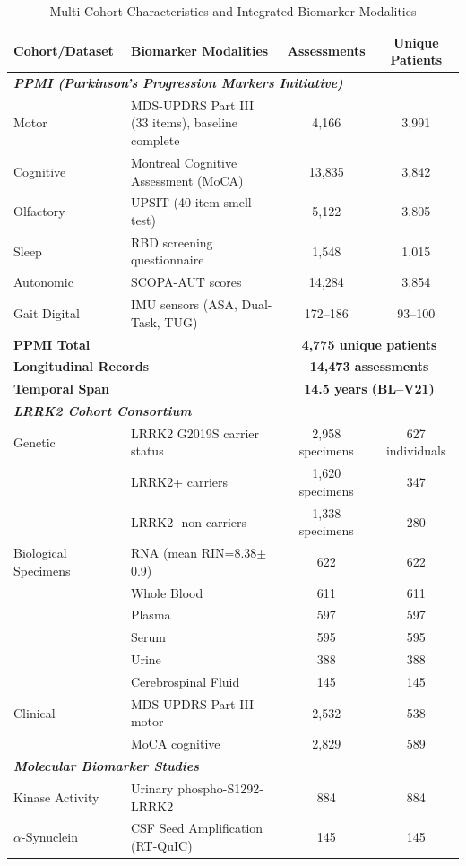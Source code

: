 \documentclass[11pt]{article}
\begin{document}
\begin{table}[ht]
\centering
\caption{Multi-Cohort Characteristics and Integrated Biomarker Modalities}
\label{tab:cohorts}
\footnotesize
\begin{tabular}{p{3.5cm}p{5cm}cc}
\toprule
\textbf{Cohort/Dataset} & \textbf{Biomarker Modalities} & \textbf{Assessments} & \textbf{Unique Patients} \\
\midrule
\multicolumn{4}{l}{\textit{\textbf{PPMI (Parkinson's Progression Markers Initiative)}}} \\
\midrule
Motor & MDS-UPDRS Part III (33 items), baseline complete & 4,166 & 3,991 \\
Cognitive & Montreal Cognitive Assessment (MoCA) & 13,835 & 3,842 \\
Olfactory & UPSIT (40-item smell test) & 5,122 & 3,805 \\
Sleep & RBD screening questionnaire & 1,548 & 1,015 \\
Autonomic & SCOPA-AUT scores & 14,284 & 3,854 \\
Gait Digital & IMU sensors (ASA, Dual-Task, TUG) & 172--186 & 93--100 \\
\midrule
\multicolumn{2}{l}{\textbf{PPMI Total}} & \multicolumn{2}{c}{\textbf{4,775 unique patients}} \\
\multicolumn{2}{l}{\textbf{Longitudinal Records}} & \multicolumn{2}{c}{\textbf{14,473 assessments}} \\
\multicolumn{2}{l}{\textbf{Temporal Span}} & \multicolumn{2}{c}{\textbf{14.5 years (BL--V21)}} \\
\midrule
\multicolumn{4}{l}{\textit{\textbf{LRRK2 Cohort Consortium}}} \\
\midrule
Genetic & LRRK2 G2019S carrier status & 2,958 specimens & 627 individuals \\
& \quad LRRK2+ carriers & 1,620 specimens & 347 \\
& \quad LRRK2- non-carriers & 1,338 specimens & 280 \\
Biological Specimens & RNA (mean RIN=8.38$\pm$0.9) & 622 & 622 \\
& Whole Blood & 611 & 611 \\
& Plasma & 597 & 597 \\
& Serum & 595 & 595 \\
& Urine & 388 & 388 \\
& Cerebrospinal Fluid & 145 & 145 \\
Clinical & MDS-UPDRS Part III motor & 2,532 & 538 \\
& MoCA cognitive & 2,829 & 589 \\
\midrule
\multicolumn{4}{l}{\textit{\textbf{Molecular Biomarker Studies}}} \\
\midrule
Kinase Activity & Urinary phospho-S1292-LRRK2 & 884 & 884 \\
$\alpha$-Synuclein & CSF Seed Amplification (RT-QuIC) & 145 & 145 \\
\bottomrule
\end{tabular}
\end{table}
\end{document}

